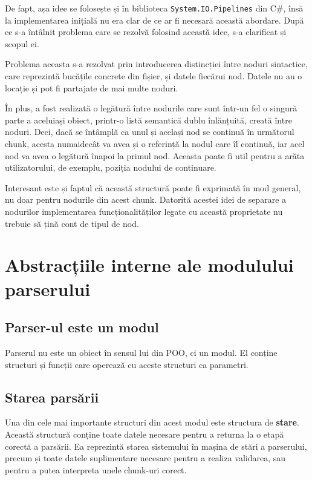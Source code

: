 \documentclass[a4paper,12pt]{report}
\begin{document}
De fapt, așa idee se folosește și în biblioteca \texttt{System.IO.Pipelines} din C\#,
însă la implementarea inițială nu era clar de ce ar fi necesară această abordare.
După ce s-a întâlnit problema care se rezolvă folosind această idee, s-a clarificat și scopul ei.

Problema aceasta s-a rezolvat prin introducerea distincției între noduri sintactice,
care reprezintă bucățile concrete din fișier, și datele fiecărui nod.
Datele nu au o locație și pot fi partajate de mai multe noduri.

În plus, a fost realizată o legătură între nodurile care sunt într-un fel o singură parte a aceluiași obiect,
printr-o listă semantică dublu înlănțuită, creată între noduri.
Deci, dacă se întâmplă ca unul și același nod se continuă în următorul chunk,
acesta numaidecât va avea și o referință la nodul care îl continuă,
iar acel nod va avea o legătură înapoi la primul nod.
Aceasta poate fi util pentru a arăta utilizatorului, de exemplu, poziția nodului de continuare.

Interesant este și faptul că această structură poate fi exprimată în mod general,
nu doar pentru nodurile din acest chunk.
Datorită acestei idei de separare a nodurilor implementarea funcționalităților
legate cu această proprietate nu trebuie să țină cont de tipul de nod.

\section{Abstracțiile interne ale modulului parserului}

\subsection{Parser-ul este un modul}

Parserul nu este un obiect în sensul lui din \ac{POO}, ci un modul.
El conține structuri și funcții care operează cu aceste structuri ca parametri.

\subsection{Starea parsării}

Una din cele mai importante structuri din acest modul este structura de \textbf{stare}.
Această structură conține toate datele necesare pentru a returna la o etapă corectă a parsării.
Ea reprezintă starea sistemului în mașina de stări a parserului,
precum și toate datele suplimentare necesare pentru a realiza validarea,
sau pentru a putea interpreta unele chunk-uri corect.
\end{document}
